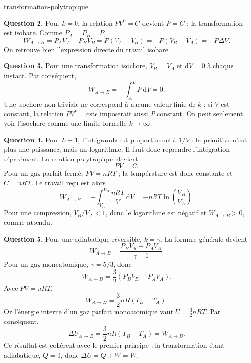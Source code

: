 \begin{exo}[Travail d'une transformation polytropique $PV^k=\text{cste}$]{transformation-polytropique}
\begin{solution}
\textbf{Question 2.} Pour $k=0$, la relation $PV^0=C$ devient
$P=C$ : la transformation est isobare. Comme $P_A=P_B=P$,
\[
W_{A\to B}
=P_AV_A-P_BV_B
=P(V_A-V_B)
=-P(V_B-V_A)
=-P\Delta V.
\]
On retrouve bien l'expression directe du travail isobare.

\textbf{Question 3.} Pour une transformation isochore,
$V_B=V_A$ et $\mathrm{d}V=0$ à chaque instant. Par conséquent,
\[
W_{A\to B}=-\int_A^B P\,\mathrm{d}V=0.
\]
Une isochore non triviale ne correspond à aucune valeur finie de $k$ : si
$V$ est constant, la relation $PV^k=\text{cste}$ imposerait aussi $P$ constant.
On peut seulement voir l'isochore comme une limite formelle $k\to\infty$.

\textbf{Question 4.} Pour $k=1$, l'intégrande est proportionnel à $1/V$ :
la primitive n'est plus une puissance, mais un logarithme. Il faut donc
reprendre l'intégration séparément. La relation polytropique devient
\[
PV=C.
\]
Pour un gaz parfait fermé, $PV=nRT$ ; la température est donc constante et
$C=nRT$. Le travail reçu est alors
\[
W_{A\to B}
=-\int_{V_A}^{V_B}\frac{nRT}{V}\,\mathrm{d}V
=-nRT\ln\!\left(\frac{V_B}{V_A}\right).
\]
Pour une compression, $V_B/V_A<1$, donc le logarithme est négatif et
$W_{A\to B}>0$, comme attendu.

\textbf{Question 5.} Pour une adiabatique réversible,
$k=\gamma$. La formule générale devient
\[
W_{A\to B}
=\frac{P_BV_B-P_AV_A}{\gamma-1}.
\]
Pour un gaz monoatomique, $\gamma=5/3$, donc
\[
W_{A\to B}
=\frac32(P_BV_B-P_AV_A).
\]
Avec $PV=nRT$,
\[
W_{A\to B}
=\frac32nR(T_B-T_A).
\]
Or l'énergie interne d'un gaz parfait monoatomique vaut
$U=\frac32nRT$. Par conséquent,
\[
\Delta U_{A\to B}
=\frac32nR(T_B-T_A)
=W_{A\to B}.
\]
Ce résultat est cohérent avec le premier principe : la transformation étant
adiabatique, $Q=0$, donc $\Delta U=Q+W=W$.
\end{solution}
\end{exo}

